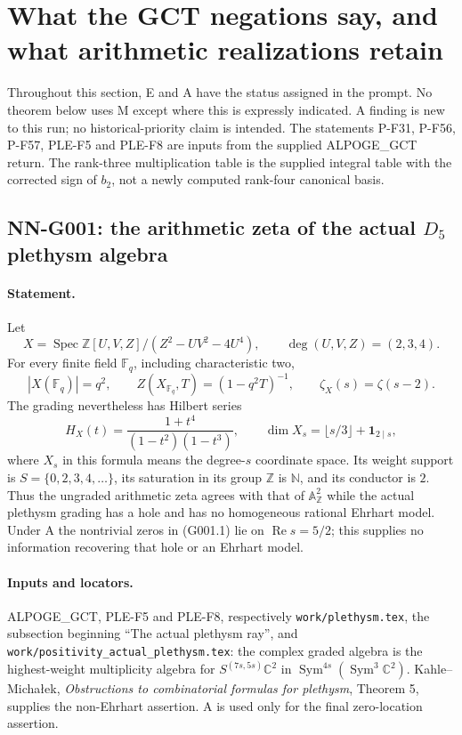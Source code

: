 \section{What the GCT negations say, and what arithmetic realizations retain}
\label{sec:nn-gct}

Throughout this section, E and A have the status assigned in the prompt.
No theorem below uses M except where this is expressly indicated. A finding
is new to this run; no historical-priority claim is intended. The statements
P-F31, P-F56, P-F57, PLE-F5 and PLE-F8 are inputs from the supplied
ALPOGE\_GCT return. The rank-three multiplication table is the supplied
integral table with the corrected sign of $b_2$, not a newly computed
rank-four canonical basis.

\subsection{NN-G001: the arithmetic zeta of the actual $D_5$ plethysm algebra}
\paragraph{Statement.}
Let
\[
 X=\operatorname{Spec}\mathbb Z[U,V,Z]/(Z^2-UV^2-4U^4),
 \qquad \deg(U,V,Z)=(2,3,4).
\]
For every finite field $\mathbb F_q$, including characteristic two,
\[
 |X(\mathbb F_q)|=q^2,\qquad
 Z(X_{\mathbb F_q},T)=(1-q^2T)^{-1},\qquad
 \zeta_X(s)=\zeta(s-2).
 \tag{G001.1}
\]
The grading nevertheless has Hilbert series
\[
 H_X(t)=\frac{1+t^4}{(1-t^2)(1-t^3)},\qquad
 \dim X_s=\lfloor s/3\rfloor+\mathbf1_{2\mid s},
 \tag{G001.2}
\]
where $X_s$ in this formula means the degree-$s$ coordinate space. Its
weight support is $S=\{0,2,3,4,\ldots\}$, its saturation in its group
$\mathbb Z$ is $\mathbb N$, and its conductor is $2$. Thus the ungraded
arithmetic zeta agrees with that of $\mathbb A^2_{\mathbb Z}$ while the
actual plethysm grading has a hole and has no homogeneous rational
Ehrhart model. Under A the nontrivial zeros in (G001.1) lie on
$\operatorname{Re}s=5/2$; this supplies no information recovering that
hole or an Ehrhart model.

\paragraph{Inputs and locators.}
ALPOGE\_GCT, PLE-F5 and PLE-F8, respectively
\texttt{work/plethysm.tex}, the subsection beginning ``The actual
plethysm ray'', and \texttt{work/positivity\_actual\_plethysm.tex}:
the complex graded algebra is the highest-weight multiplicity algebra
for $S^{(7s,5s)}\mathbb C^2$ in
$\operatorname{Sym}^{4s}(\operatorname{Sym}^3\mathbb C^2)$.
Kahle--Micha\l{}ek, \emph{Obstructions to combinatorial formulas for
plethysm}, Theorem 5, supplies the non-Ehrhart assertion. A is used
only for the final zero-location assertion.

